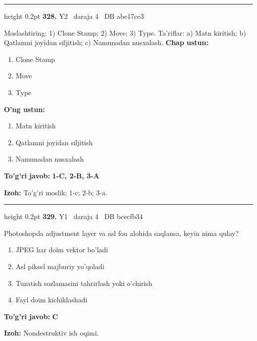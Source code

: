 \documentclass[10pt,a4paper,oneside]{article}
\begin{document}
\vspace{2mm}\hrule height 0.2pt \vspace{4mm}
\hypertarget{q328}{\textbf{\color{ink}328.}}  {\color{muted}\scriptsize Y2 \textbullet\ daraja 4 \textbullet\ DB abe17ce3}
\par
Moslashtiring: 1) Clone Stamp; 2) Move; 3) Type. Ta'riflar: a) Matn kiritish; b) Qatlamni joyidan siljitish; c) Namunadan nusxalash.
\textbf{\footnotesize Chap ustun:}
\begin{enumerate}[label=\arabic*),leftmargin=9mm]
\item Clone Stamp
\item Move
\item Type
\end{enumerate}
\textbf{\footnotesize O'ng ustun:}
\begin{enumerate}[label=\Alph*),leftmargin=9mm]
\item Matn kiritish
\item Qatlamni joyidan siljitish
\item Namunadan nusxalash
\end{enumerate}
\begin{tcolorbox}[enhanced,breakable,colback=teal!4,colframe=teal!45!black,boxrule=0.45pt,arc=1.2mm,left=2.8mm,right=2.8mm,top=2mm,bottom=2mm,before skip=2mm,after skip=2mm]
\textbf{\color{teal}To'g'ri javob:} \textbf{1-C, 2-B, 3-A}
\par\smallskip
\textbf{Izoh:} To'g'ri moslik: 1-c; 2-b; 3-a.
\end{tcolorbox}
\vspace{2mm}\hrule height 0.2pt \vspace{4mm}
\hypertarget{q329}{\textbf{\color{ink}329.}}  {\color{muted}\scriptsize Y1 \textbullet\ daraja 4 \textbullet\ DB bcecfb34}
\par
Photoshopda adjustment layer va asl fon alohida saqlansa, keyin nima qulay?
\begin{enumerate}[label=\Alph*),leftmargin=9mm]
\item JPEG har doim vektor bo'ladi
\item Asl piksel majburiy yo'qoladi
\item Tuzatish sozlamasini tahrirlash yoki o'chirish
\item Fayl doim kichiklashadi
\end{enumerate}
\begin{tcolorbox}[enhanced,breakable,colback=teal!4,colframe=teal!45!black,boxrule=0.45pt,arc=1.2mm,left=2.8mm,right=2.8mm,top=2mm,bottom=2mm,before skip=2mm,after skip=2mm]
\textbf{\color{teal}To'g'ri javob:} \textbf{C}
\par\smallskip
\textbf{Izoh:} Nondestruktiv ish oqimi.
\end{tcolorbox}
\end{document}

